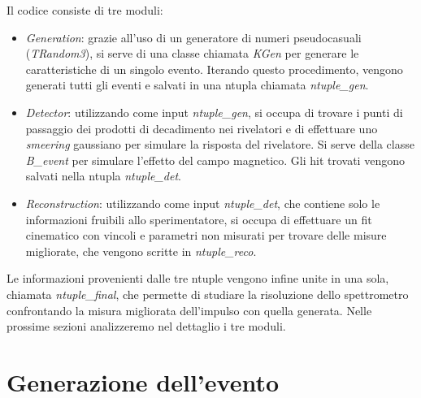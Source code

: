 \documentclass[8pt]{extarticle}
\begin{document}
Il codice consiste di tre moduli: \\
\begin{itemize}
\item \textit{Generation}: grazie all'uso di un generatore di numeri pseudocasuali (\textit{TRandom3}), si serve di una classe chiamata \textit{KGen} per generare le caratteristiche di un singolo evento. Iterando questo procedimento, vengono generati tutti gli eventi e salvati in una ntupla chiamata \textit{ntuple\_gen}.
\item \textit{Detector}: utilizzando come input \textit{ntuple\_gen}, si occupa di trovare i punti di passaggio dei prodotti di decadimento nei rivelatori e di effettuare uno \textit{smeering} gaussiano per simulare la risposta del rivelatore. Si serve della classe \textit{B\_event} per simulare l'effetto del campo magnetico. Gli hit trovati vengono salvati nella ntupla \textit{ntuple\_det}.
\item \textit{Reconstruction}: utilizzando come input \textit{ntuple\_det}, che contiene solo le informazioni fruibili allo sperimentatore, si occupa di effettuare un fit cinematico con vincoli e parametri non misurati per trovare delle misure migliorate, che vengono scritte in \textit{ntuple\_reco}.
\end{itemize}

Le informazioni provenienti dalle tre ntuple vengono infine unite in una sola, chiamata \textit{ntuple\_final}, che permette di studiare la risoluzione dello spettrometro confrontando la misura migliorata dell'impulso con quella generata. Nelle prossime sezioni analizzeremo nel dettaglio i tre moduli. \\

\section{Generazione dell'evento} \label{sec:generation}
\end{document}
